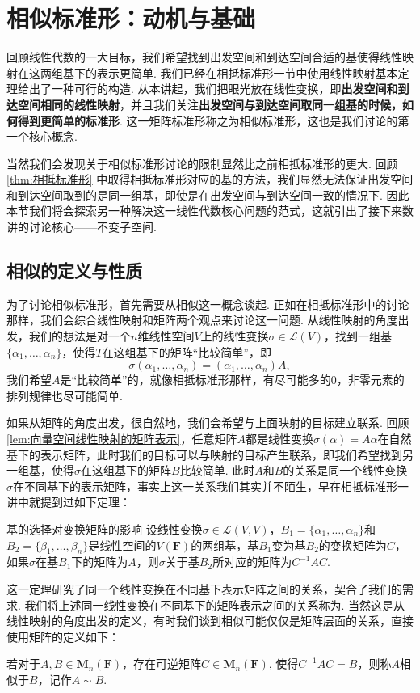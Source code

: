 \chapter{相似标准形：动机与基础}

回顾线性代数的一大目标，我们希望找到出发空间和到达空间合适的基使得线性映射在这两组基下的表示更简单. 我们已经在相抵标准形一节中使用线性映射基本定理给出了一种可行的构造. 从本讲起，我们把眼光放在线性变换，即\textbf{出发空间和到达空间相同的线性映射}，并且我们关注\textbf{出发空间与到达空间取同一组基的时候，如何得到更简单的标准形}. 这一矩阵标准形称之为相似标准形，这也是我们讨论的第一个核心概念.

当然我们会发现关于相似标准形讨论的限制显然比之前相抵标准形的更大. 回顾\autoref{thm:相抵标准形} 中取得相抵标准形对应的基的方法，我们显然无法保证出发空间和到达空间取到的是同一组基，即使是在出发空间与到达空间一致的情况下. 因此本节我们将会探索另一种解决这一线性代数核心问题的范式，这就引出了接下来数讲的讨论核心——不变子空间.

\section{相似的定义与性质}

为了讨论相似标准形，首先需要从相似这一概念谈起. 正如在相抵标准形中的讨论那样，我们会综合线性映射和矩阵两个观点来讨论这一问题. 从线性映射的角度出发，我们的想法是对一个$n$维线性空间$V$上的线性变换$\sigma\in\mathcal{L}(V)$，找到一组基$\{\alpha_1,\ldots,\alpha_n\}$，使得$T$在这组基下的矩阵``比较简单''，即
\[\sigma(\alpha_1,\ldots,\alpha_n)=(\alpha_1,\ldots,\alpha_n)A,\]
我们希望$A$是``比较简单''的，就像相抵标准形那样，有尽可能多的$0$，非零元素的排列规律也尽可能简单.

如果从矩阵的角度出发，很自然地，我们会希望与上面映射的目标建立联系. 回顾\autoref{lem:向量空间线性映射的矩阵表示}，任意矩阵$A$都是线性变换$\sigma(\alpha)=A\alpha$在自然基下的表示矩阵，此时我们的目标可以与映射的目标产生联系，即我们希望找到另一组基，使得$\sigma$在这组基下的矩阵$B$比较简单. 此时$A$和$B$的关系是同一个线性变换$\sigma$在不同基下的表示矩阵，事实上这一关系我们其实并不陌生，早在相抵标准形一讲中就提到过如下定理：
\begin{theorem}{基的选择对变换矩阵的影响}{}
    设线性变换$\sigma \in \mathcal{L}(V,V)$，$B_1=\{\alpha_1,\ldots,\alpha_n\}$和$B_2=\{\beta_1,\ldots,\beta_n\}$是线性空间的$V(\mathbf{F})$的两组基，基$B_1$变为基$B_2$的变换矩阵为$C$，如果$\sigma$在基$B_1$下的矩阵为$A$，则$\sigma$关于基$B_2$所对应的矩阵为$C^{-1}AC$.
\end{theorem}
这一定理研究了同一个线性变换在不同基下表示矩阵之间的关系，契合了我们的需求. 我们将上述同一线性变换在不同基下的矩阵表示之间的关系称为. 当然这是从线性映射的角度出发的定义，有时我们谈到相似可能仅仅是矩阵层面的关系，直接使用矩阵的定义如下：
\begin{definition}{}{}
    若对于$A,B\in \mathbf{M}_n(\mathbf{F})$，存在可逆矩阵$C\in \mathbf{M}_n(\mathbf{F})$, 使得$C^{-1}AC=B$，则称$A$相似于$B$，记作$A\sim B$.
\end{definition}

